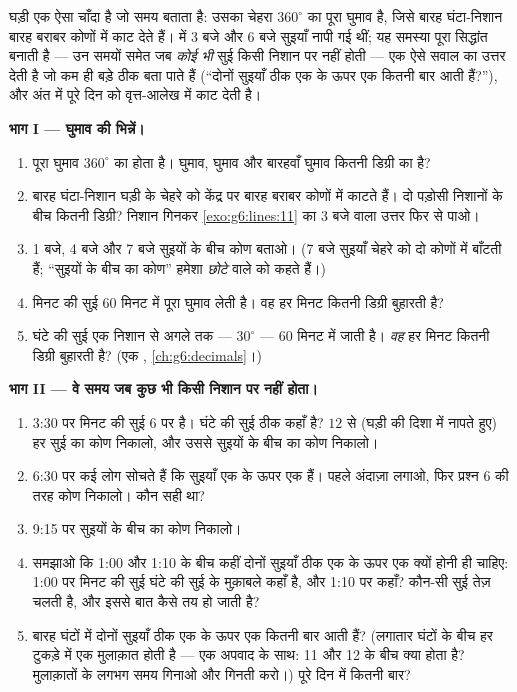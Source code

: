 \begin{problem}[{सप्ताहांत समस्या --- कोण घुमाव की भिन्नों के
रूप में: उन्हें घड़ी पर पढ़ना, वे क्षण खोजना जब सुइयाँ मिलती
हैं, और एक दिन को वृत्त-आलेख में काटना}]
\label{pb:g6:lines:1}
घड़ी एक ऐसा चाँदा है जो समय बताता है: उसका चेहरा $360^\circ$ का
पूरा घुमाव है, जिसे बारह घंटा-निशान बारह बराबर कोणों में काट
देते हैं।  में 3 बजे और 6 बजे सुइयाँ नापी
गई थीं; यह समस्या पूरा सिद्धांत बनाती है --- उन समयों समेत जब
\emph{कोई भी} सुई किसी निशान पर नहीं होती --- एक ऐसे सवाल का
उत्तर देती है जो कम ही बड़े ठीक बता पाते हैं (``दोनों सुइयाँ
ठीक एक के ऊपर एक कितनी बार आती हैं?''), और अंत में पूरे दिन को
वृत्त-आलेख में काट देती है।

\medskip
\noindent\textbf{भाग I --- घुमाव की भिन्नें।}
\begin{enumerate}
  \item पूरा घुमाव $360^\circ$ का होता है।  घुमाव, 
        घुमाव और बारहवाँ घुमाव कितनी डिग्री का है?
  \item बारह घंटा-निशान घड़ी के चेहरे को केंद्र पर बारह बराबर
        कोणों में काटते हैं। दो पड़ोसी निशानों के बीच कितनी
        डिग्री? निशान गिनकर \cref{exo:g6:lines:11} का 3 बजे वाला
        उत्तर फिर से पाओ।
  \item 1 बजे, 4 बजे और 7 बजे सुइयों के बीच कोण बताओ। (7 बजे
        सुइयाँ चेहरे को दो कोणों में बाँटती हैं; ``सुइयों के बीच
        का कोण'' हमेशा \emph{छोटे} वाले को कहते हैं।)
  \item मिनट की सुई $60$ मिनट में पूरा घुमाव लेती है। वह हर मिनट
        कितनी डिग्री बुहारती है?
  \item घंटे की सुई एक निशान से अगले तक --- $30^\circ$ ---
        $60$ मिनट में जाती है। \emph{वह} हर मिनट कितनी डिग्री
        बुहारती है? (एक ,
        \cref{ch:g6:decimals}।)
\end{enumerate}

\medskip
\noindent\textbf{भाग II --- वे समय जब कुछ भी किसी निशान पर नहीं
होता।}
\begin{enumerate}[resume]
  \item 3:30 पर मिनट की सुई $6$ पर है। घंटे की सुई ठीक कहाँ है?
        $12$ से (घड़ी की दिशा में नापते हुए) हर सुई का कोण
        निकालो, और उससे सुइयों के बीच का कोण निकालो।
  \item 6:30 पर कई लोग सोचते हैं कि सुइयाँ एक के ऊपर एक हैं।
        पहले अंदाज़ा लगाओ, फिर प्रश्न 6 की तरह कोण निकालो। कौन
        सही था?
  \item 9:15 पर सुइयों के बीच का कोण निकालो।
  \item समझाओ कि 1:00 और 1:10 के बीच कहीं दोनों सुइयाँ ठीक एक के
        ऊपर एक क्यों होनी ही चाहिए: 1:00 पर मिनट की सुई घंटे की
        सुई के मुक़ाबले कहाँ है, और 1:10 पर कहाँ? कौन-सी सुई तेज़
        चलती है, और इससे बात कैसे तय हो जाती है?
  \item बारह घंटों में दोनों सुइयाँ ठीक एक के ऊपर एक कितनी बार
        आती हैं? (लगातार घंटों के बीच हर टुकड़े में एक मुलाक़ात
        होती है --- एक अपवाद के साथ: 11 और 12 के बीच क्या होता
        है? मुलाक़ातों के लगभग समय गिनाओ और गिनती करो।) पूरे दिन
        में कितनी बार?
\end{enumerate}


\end{problem}
